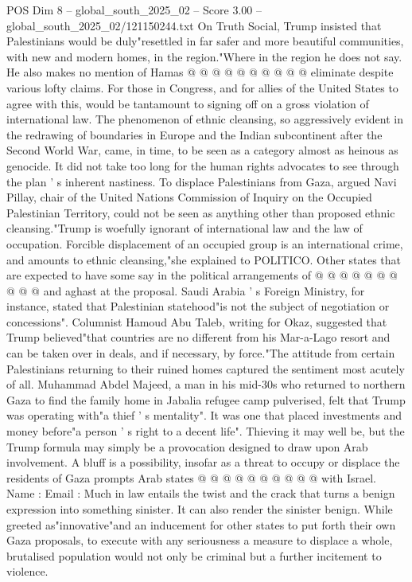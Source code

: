 \begin{textsample}{POS Dim 8 – global\_south\_2025\_02 – Score 3.00 – global\_south\_2025\_02/121150244.txt}
On Truth Social, Trump insisted that Palestinians would be duly"resettled in far safer and more beautiful communities, with new and modern homes, in the region."Where in the region he does not say.
He also makes no mention of Hamas @ @ @ @ @ @ @ @ @ @ eliminate despite various lofty claims.
For those in Congress, and for allies of the United States to agree with this, would be tantamount to signing off on a gross violation of international law.
The phenomenon of ethnic cleansing, so aggressively evident in the redrawing of boundaries in Europe and the Indian subcontinent after the Second World War, came, in time, to be seen as a category almost as heinous as genocide.
It did not take too long for the human rights advocates to see through the plan ' s inherent nastiness.
To displace Palestinians from Gaza, argued Navi Pillay, chair of the United Nations Commission of Inquiry on the Occupied Palestinian Territory, could not be seen as anything other than proposed ethnic cleansing."Trump is woefully ignorant of international law and the law of occupation.
Forcible displacement of an occupied group is an international crime, and amounts to ethnic cleansing,"she explained to POLITICO.
Other states that are expected to have some say in the political arrangements of @ @ @ @ @ @ @ @ @ @ and aghast at the proposal.
Saudi Arabia ' s Foreign Ministry, for instance, stated that Palestinian statehood"is not the subject of negotiation or concessions".
Columnist Hamoud Abu Taleb, writing for Okaz, suggested that Trump believed"that countries are no different from his Mar-a-Lago resort and can be taken over in deals, and if necessary, by force."The attitude from certain Palestinians returning to their ruined homes captured the sentiment most acutely of all.
Muhammad Abdel Majeed, a man in his mid-30s who returned to northern Gaza to find the family home in Jabalia refugee camp pulverised, felt that Trump was operating with"a thief ' s mentality".
It was one that placed investments and money before"a person ' s right to a decent life".
Thieving it may well be, but the Trump formula may simply be a provocation designed to draw upon Arab involvement.
A bluff is a possibility, insofar as a threat to occupy or displace the residents of Gaza prompts Arab states @ @ @ @ @ @ @ @ @ @ with Israel.
Name : Email : Much in law entails the twist and the crack that turns a benign expression into something sinister.
It can also render the sinister benign.
While greeted as"innovative"and an inducement for other states to put forth their own Gaza proposals, to execute with any seriousness a measure to displace a whole, brutalised population would not only be criminal but a further incitement to violence.

\end{textsample}
